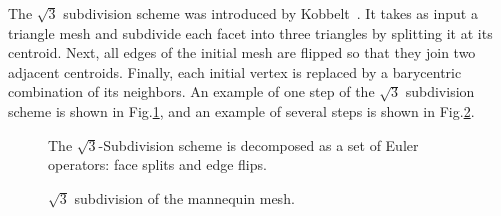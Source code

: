 \label{sec:subdivision_euler}

The $\sqrt{3}$ subdivision scheme was introduced by
Kobbelt~\cite{sqrt3}. It takes as input a triangle mesh and
subdivide each facet into three triangles by splitting it at its
centroid. Next, all edges of the initial mesh are flipped so that they
join two adjacent centroids. Finally, each initial vertex is replaced
by a barycentric combination of its neighbors. An example of one step
of the $\sqrt{3}$ subdivision scheme is shown in
Fig.\ref{fig:sqrt3_basic}, and an example of several steps is shown in
Fig.\ref{fig:sqrt3}.


\begin{figure}[htb]
    \caption{The $\sqrt{3}$-Subdivision scheme is decomposed as
             a set of Euler operators: face splits and edge flips.}
    \label{fig:sqrt3_basic}
\end{figure}







\begin{figure}[htb]
    \caption{$\sqrt{3}$ subdivision of the mannequin mesh.}
    \label{fig:sqrt3}
\end{figure}
